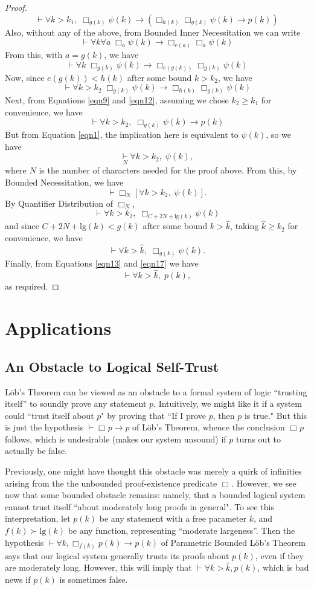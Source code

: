 \documentclass[jsl,reqno,bibay2]{asl}
\newcommand{\ef}{e}
\numberwithin{equation}{section}
\newcommand{\eqn}[1]{\begin{equation}#1\end{equation}}
\theoremstyle{definition}
\newcommand{\proves}[1]{\underset{#1}{\vdash}}
\newcommand{\bx}[1]{\Box_{#1}}
\renewcommand{\implies}{\rightarrow}
\renewcommand{\lg}[1]{\mathrm{lg}(#1)}
\renewcommand{\-}{^{-1}}
\begin{document}
\begin{proof}
\eqn{\label{eqn9}
\proves{} \forall k>k_1, \; \bx{g(k)}\psi(k) \implies \left(\bx{h(k)}\bx{g(k)}\psi(k) \implies p(k)\right)
}
Also, without any of the above, from Bounded Inner Necessitation we can write
$$\proves{} \forall k \forall a \; \bx{a}\psi(k)\implies \bx{\ef(a)}\bx{a}\psi(k)$$
From this, with $a=g(k)$, we have
$$\proves{} \forall k \; \bx{g(k)}\psi(k)\implies \bx{\ef(g(k))}\bx{g(k)}\psi(k)$$
Now, since $\ef(g(k)) < h(k)$ after some bound $k>k_2$, we have
\eqn{\label{eqn12}
\proves{} \forall k > k_2 \; \bx{g(k)}\psi(k)\implies \bx{h(k)}\bx{g(k)}\psi(k)
}
Next, from Equations \ref{eqn9} and \ref{eqn12}, assuming we chose $k_2\geq k_1$ for convenience, we have
\eqn{\label{eqn13}
\proves{} \forall k>k_2,\; \bx{g(k)}\psi(k)\implies p(k)
}
But from Equation \ref{eqn1}, the implication here is equivalent to $\psi(k)$, so we have
$$ \proves{N} \forall k>k_2,\; \psi(k),$$
where $N$ is the number of characters needed for the proof above.  From this, by Bounded Necessitation, we have
$$\proves{} \bx{N} [\forall k>k_2,\; \psi(k)].$$
By Quantifier Distribution of $\bx{N}$,
$$\proves{} \forall k>k_2,\; \bx{C + 2N + \lg{k}} \psi(k)$$
and since $C + 2N + \lg{k} < g(k)$ after some bound $k>\hat k$, taking $\hat k \geq k_2$ for convenience, we have
\eqn{\label{eqn17}
\proves{}\forall k>\hat k,\; \bx{g(k)}\psi(k).
}
Finally, from Equations \ref{eqn13} and \ref{eqn17} we have
$$\proves{} \forall k>\hat k,\; p(k),$$
as required.
\end{proof}


\section{Applications}
\subsection{An Obstacle to Logical Self-Trust}
\label{sec:selftrust}
L\"{o}b's Theorem can be viewed as an obstacle to a formal system of logic ``trusting itself'' to soundly prove any statement $p$.  Intuitively, we might like it if a system could ``trust itself about $p$" by proving that ``If I prove $p$, then $p$ is true."  But this is just the hypothesis $\proves{} \bx{}p \implies p$ of L\"{o}b's Theorem, whence the conclusion $\bx{}p$ follows, which is undesirable (makes our system unsound) if $p$ turns out to actually be false.

Previously, one might have thought this obstacle was merely a quirk of infinities arising from the the unbounded proof-existence predicate $\bx{}$.  However, we see now that some bounded obstacle remains: namely, that a bounded logical system cannot trust itself ``about moderately long proofs in general".  To see this interpretation, let $p(k)$ be any statement with a free parameter $k$, and $f(k) \succ \lg{k}$ be any function, representing ``moderate largeness''.  Then the hypothesis $\proves{} \forall k, \bx{f(k)} p(k) \implies p(k)$ of Parametric Bounded L\"{o}b's Theorem says that our logical system generally trusts its proofs about $p(k)$, even if they are moderately long.  However, this will imply that $\proves{} \forall k > \hat k, p(k)$, which is bad news if $p(k)$ is sometimes false.
\end{document}
